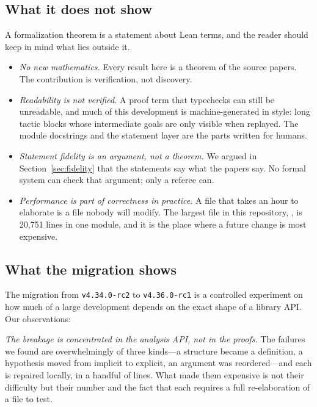 \subsection{What it does not show}

A formalization theorem is a statement about Lean terms, and the reader should keep in mind
what lies outside it.

\begin{itemize}
\item \emph{No new mathematics.} Every result here is a theorem of the source papers. The
      contribution is verification, not discovery.
\item \emph{Readability is not verified.} A proof term that typechecks can still be
      unreadable, and much of this development is machine-generated in style: long tactic
      blocks whose intermediate goals are only visible when replayed. The module docstrings
      and the statement layer are the parts written for humans.
\item \emph{Statement fidelity is an argument, not a theorem.} We argued in
      Section~\ref{sec:fidelity} that the statements say what the papers say. No formal
      system can check that argument; only a referee can.
\item \emph{Performance is part of correctness in practice.} A file that takes an hour to
      elaborate is a file nobody will modify. The largest file in this repository,
      , is 20{,}751 lines in one module, and it is the place
      where a future change is most expensive.
\end{itemize}

\subsection{What the migration shows}

The migration from \Lean{} \texttt{v4.34.0-rc2} to \texttt{v4.36.0-rc1} is a controlled
experiment on how much of a large development depends on the exact shape of a library API.
Our observations:

\emph{The breakage is concentrated in the analysis API, not in the proofs.} The failures we
found are overwhelmingly of three kinds---a structure became a definition, a hypothesis moved
from implicit to explicit, an argument was reordered---and each is repaired locally, in a
handful of lines. What made them expensive is not their difficulty but their number and the
fact that each requires a full re-elaboration of a file to test.

